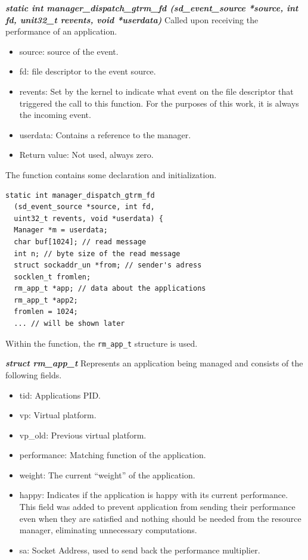 \documentclass[nobiblatex]{LTHthesis}
\begin{document}
\begin{framed}
	\begin{flushleft}
		\textbf{\emph{static int manager\_dispatch\_gtrm\_fd \newline
      (sd\_event\_source *source, int fd, unit32\_t revents, void *userdata)}} \newline 
			Called upon receiving the performance of an application.
			\begin{itemize}
			\item source: source of the event.
			\item fd: file descriptor to the event source.
			\item revents: Set by the kernel to indicate what event on the file
        descriptor that triggered the call to this function. For the purposes
        of this work, it is always the incoming event.
			\item userdata: Contains a reference to the manager.
			\item Return value: Not used, always zero.
			\end{itemize}
	\end{flushleft}	
\end{framed}

The function contains some declaration and initialization.
\begin{lstlisting}
static int manager_dispatch_gtrm_fd
  (sd_event_source *source, int fd,
  uint32_t revents, void *userdata) {
  Manager *m = userdata;    		    
  char buf[1024]; // read message
  int n; // byte size of the read message
  struct sockaddr_un *from; // sender's adress
  socklen_t fromlen;
  rm_app_t *app; // data about the applications
  rm_app_t *app2;	
  fromlen = 1024;
  ... // will be shown later
\end{lstlisting}

Within the function, the \texttt{rm\_app\_t} structure is used.
\begin{framed}
	\begin{flushleft}
		\textbf{\emph{struct rm\_app\_t}}
		Represents an application being managed and consists of the 
    following fields.
		\begin{itemize}
		\item tid: Applications PID.
		\item vp: Virtual platform.
		\item vp\_old: Previous virtual platform.
		\item performance: Matching function of the application.
		\item weight: The current ``weight'' of the application.
		\item happy: Indicates if the application is happy with its 
      current performance. This field was added to prevent application from
      sending their performance even when they are satisfied and nothing 
      should be needed from the resource manager, eliminating unnecessary 
      computations.
		\item sa: Socket Address, used to send back the performance 
      multiplier.
		\end{itemize}
	\end{flushleft}	
\end{framed}
\end{document}
